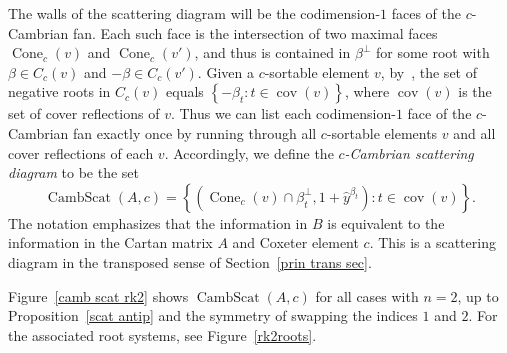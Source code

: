 \documentclass[ALCO,ThmDefs,Unicode,epreuves]{cedram}
\DeclareMathOperator{\cov}{cov}
\DeclareMathOperator{\Cone}{Cone}
\DeclareMathOperator{\CambScat}{CambScat}
\newcommand{\newword}[1]{\emph{#1}}
\newcommand{\set}[1]{{\left\lbrace #1 \right\rbrace}}
\newcommand{\hy}{\hat{y}}
\begin{document}
The walls of the scattering diagram will be the codimension-$1$ faces of the $c$-Cambrian fan.
Each such face is the intersection of two maximal faces $\Cone_c(v)$ and $\Cone_c(v')$, and thus is contained in $\beta^\perp$ for some root with $\beta\in C_c(v)$ and $-\beta\in C_c(v')$.
Given a $c$-sortable element $v$, by~\cite[Proposition~5.2]{typefree}, the set of negative roots in $C_c(v)$ equals $\set{-\beta_t:t\in\cov(v)}$, where $\cov(v)$ is the set of cover reflections of $v$.
Thus we can list each codimension-$1$ face of the $c$-Cambrian fan exactly once by running through all $c$-sortable elements $v$ and all cover reflections of each $v$.
Accordingly, we define the \newword{$c$-Cambrian scattering diagram} to be the set 
\begin{equation}
\CambScat(A,c)=\set{(\Cone_c(v)\cap\beta_t^\perp,1+\hy^{\beta_t}):t\in\cov(v)}.
\end{equation}
The notation emphasizes that the information in $B$ is equivalent to the information in the Cartan matrix $A$ and Coxeter element $c$.
This is a scattering diagram in the transposed sense of Section~\ref{prin trans sec}.

\begin{exam}\label{scat rk2}
Figure~\ref{camb scat rk2} shows $\CambScat(A,c)$ for all cases with $n=2$, up to Proposition~\ref{scat antip} and the symmetry of swapping the indices $1$ and $2$.
For the associated root systems, see Figure~\ref{rk2roots}.
\end{exam}

\end{document}
